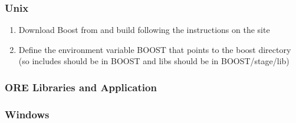 \documentclass[12pt, a4paper]{article}
\begin{document}
\subsubsection*{Unix}

\begin{enumerate}
\item Download Boost from \cite{boost} and build following the instructions on the site
\item Define the environment variable BOOST that points to the boost directory
(so includes should be in BOOST and libs should be in BOOST/stage/lib)
\end{enumerate}

\subsubsection{ORE Libraries and Application}\label{sec:build}

\subsubsection*{Windows}
\end{document}
